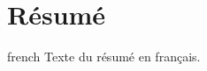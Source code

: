 \chapter*{Résumé}                      %

\begin{otherlanguage*}{french}
  Texte du résumé en français.
\end{otherlanguage*}
